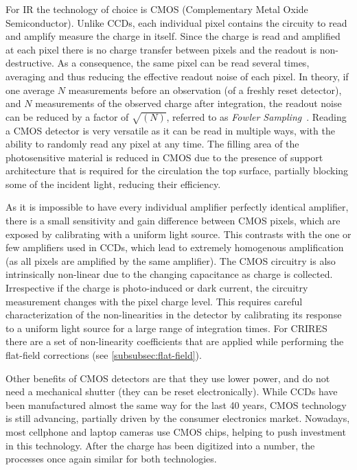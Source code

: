 For {IR} the technology of choice is {CMOS} (Complementary Metal Oxide Semiconductor).
Unlike {CCDs}, each individual pixel contains the circuity to read and amplify measure the charge in itself.
Since the charge is read and amplified at each pixel there is no charge transfer between pixels and the readout is non-destructive.
As a consequence, the same pixel can be read several times, averaging and thus reducing the effective readout noise of each pixel.
In theory, if one average $N$ measurements before an observation (of a freshly reset detector), and $N$ measurements of the observed charge after integration, the readout noise can be reduced by a factor of $\sqrt{(N)}$, referred to as \emph{Fowler Sampling}~\citep{fowler_demonstration_1990}.
Reading a {CMOS} detector is very versatile as it can be read in multiple ways, with the ability to randomly read any pixel at any time.
The filling area of the photosensitive material is reduced in {CMOS} due to the presence of support architecture that is required for the circulation the top surface, partially blocking some of the incident light, reducing their efficiency.

As it is impossible to have every individual amplifier perfectly identical amplifier, there is a small sensitivity and gain difference between {CMOS} pixels, which are exposed by calibrating with a uniform light source.
This contrasts with the one or few amplifiers used in {CCDs}, which lead to extremely homogenous amplification (as all pixels are amplified by the same amplifier).
The {CMOS} circuitry is also intrinsically non-linear due to the changing capacitance as charge is collected.
Irrespective if the charge is photo-induced or dark current, the circuitry measurement changes with the pixel charge level.
This requires careful characterization of the non-linearities in the detector by calibrating its response to a uniform light source for a large range of integration times.
For {CRIRES} there are a set of non-linearity coefficients that are applied while performing the flat-field corrections (see \cref{subsubsec:flat-field}).

Other benefits of {CMOS} detectors are that they use lower power, and do not need a mechanical shutter (they can be reset electronically).
While {CCDs} have been manufactured almost the same way for the last 40 years, {CMOS} technology is still advancing, partially driven by the consumer electronics market.
Nowadays, most cellphone and laptop cameras use {CMOS} chips, helping to push investment in this technology.
After the charge has been digitized into a number, the processes once again similar for both technologies.

